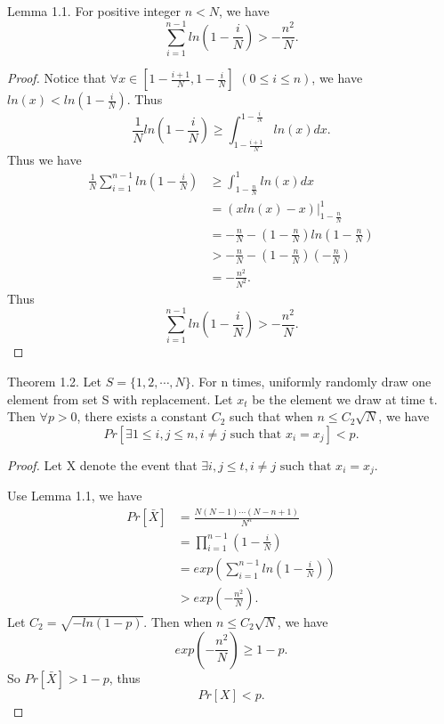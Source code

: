 \documentclass{article}
\begin{document}
\begin{spacing}{1.1}
    \subsection{}
    Lemma 1.1. For positive integer $n < N$, we have
    $$\sum_{i=1}^{n-1}ln(1 - \frac{i}{N}) >-\frac{n^2}{N}.$$
    \begin{proof}
        Notice that $\forall x\in [1 -\frac{i+1}{N}, 1 - \frac{i}{N}]$ $(0\leq i\leq n)$, we have $ln(x) < ln(1 - \frac{i}{N})$. Thus
        $$\frac{1}{N}ln(1 - \frac{i}{N}) \geq \int_{1 - \frac{i+1}{N}}^{1 - \frac{i}{N}}ln(x)dx.$$
        Thus we have
        \begin{equation}
            \begin{aligned}
                \frac{1}{N}\sum_{i=1}^{n-1}ln(1 - \frac{i}{N}) &\geq \int_{1-\frac{n}{N}}^1 ln(x)dx\\
                &= (xln(x) - x)|_{1-\frac{n}{N}}^1\\
                &= -\frac{n}{N} - (1 - \frac{n}{N})ln(1 - \frac{n}{N})\\
                &> -\frac{n}{N} - (1 - \frac{n}{N})(-\frac{n}{N})\\
                &= - \frac{n^2}{N^2}.
            \end{aligned}
        \end{equation}
        Thus
        $$\sum_{i=1}^{n-1}ln(1 - \frac{i}{N}) > -\frac{n^2}{N}.$$
    \end{proof}
    Theorem 1.2. Let $S = \{1, 2, \cdots, N\}$. For n times, uniformly randomly draw one element from set S with replacement. Let $x_t$ be the element we draw at time t. Then $\forall p > 0$, there exists a constant $C_2$ such that when $n \leq C_2 \sqrt{N}$, we have
    $$Pr[\exists 1\leq i, j \leq n, i\not = j \text{ such that } x_i = x_j] < p.$$
    \begin{proof}
        Let X denote the event that $\exists i, j \leq t, i\not = j \text{ such that } x_i = x_j$.

        Use Lemma 1.1, we have
        \begin{equation}
            \begin{aligned}
                Pr[\bar{X}] &= \frac{N(N-1)\cdots (N-n+1)}{N^n}\\
                &= \prod_{i=1}^{n-1}(1 - \frac{i}{N})\\
                &= exp(\sum_{i=1}^{n-1}ln(1 - \frac{i}{N}))\\
                &> exp(-\frac{n^2}{N}).
            \end{aligned}
        \end{equation}
        Let $C_2 = \sqrt{-ln(1-p)}$. Then when $n \leq C_2\sqrt{N}$, we have
        $$exp(-\frac{n^2}{N}) \geq 1 - p.$$
        So $Pr[\bar{X}] > 1 - p$, thus
        $$Pr[X] < p.$$
    \end{proof}

\end{spacing}
\end{document}

